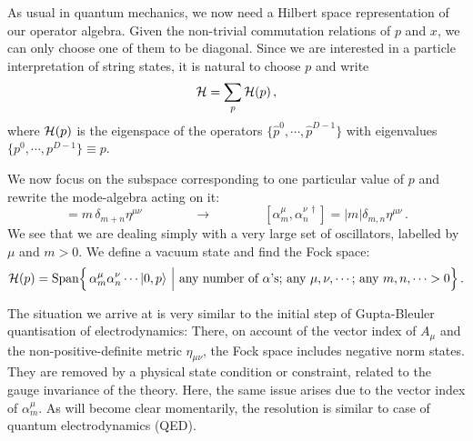 \documentclass[12pt]{article}
\newcommand{\be}{\begin{equation}}
\newcommand{\ee}{\end{equation}}
\numberwithin{equation}{section}
\begin{document}
As usual in quantum mechanics, we now need a Hilbert space representation of our operator algebra. Given the non-trivial commutation relations of $p$ and $x$, we can only choose one of them to be diagonal. Since we are interested in a particle interpretation of string states, it is natural to choose $p$ and write
\be
{\cal H}=\sum_p{\cal H}(p)\,,
\ee
where ${\cal H}(p)$ is the eigenspace of the operators $\{\hat{p}^0,\cdots,\hat{p}^{D-1}\}$ with eigenvalues $\{p^0,\cdots,p^{D-1}\}\equiv p$.

We now focus on the subspace corresponding to one particular value of $p$ and rewrite the mode-algebra acting on it:
\be
[\alpha_m^\mu,\alpha_n^\nu]=m\,\delta_{m+n}\eta^{\mu\nu}\qquad\qquad
\to\qquad \qquad
[\alpha_m^\mu,\alpha_n^{\nu\,\dagger}]=|m|\delta_{m,n}\eta^{\mu\nu}\,.
\ee
We see that we are dealing simply with a very large set of oscillators, labelled by $\mu$ and $m>0$. We define a vacuum state and find the Fock space:
\be
{\cal H}(p)=\mbox{Span}\Big\{\,\alpha_m^\mu\alpha_n^\nu\cdots |0,p\rangle\,\,\Big| \,\, \mbox{any number of $\alpha$'s; any $\mu,\nu,\cdots$; any $m,n,\cdots >0$}\Big\}\,.
\ee

The situation we arrive at is very similar to the initial step of Gupta-Bleuler quantisation of electrodynamics: There, on account of the vector index of $A_\mu$ and the non-positive-definite metric $\eta_{\mu\nu}$, the Fock space includes negative norm states. They are removed by a physical state condition or constraint, related to the gauge invariance of the theory. Here, the same issue arises due to the vector index of $\alpha^\mu_m$. As will become clear momentarily, the resolution is similar to case of quantum electrodynamics (QED).
\end{document}
